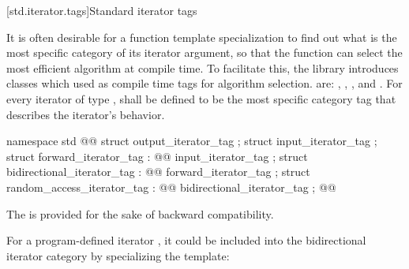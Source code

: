 [std.iterator.tags]{Standard iterator tags}

\pnum
{}%
%
%
%
%
It is often desirable for a
function template specialization
to find out what is the most specific category of its iterator
argument, so that the function can select the most efficient algorithm at compile time.
To facilitate this, the
library introduces
classes which  used as compile time tags for algorithm selection.
 are:
,
,
,
and
.
For every iterator of type
,
shall be defined to be the most specific category tag that describes the
iterator's behavior.

\begin{codeblock}
namespace std { @@
  struct output_iterator_tag { };
  struct input_iterator_tag { };
  struct forward_iterator_tag : @@ input_iterator_tag { };
  struct bidirectional_iterator_tag : @@ forward_iterator_tag { };
  struct random_access_iterator_tag : @@ bidirectional_iterator_tag { };
}@\added{\}\}\}}@
\end{codeblock}

\begin{addedblock}
\pnum
\enternote
The  is provided for the sake of backward compatibility.
\exitnote
\end{addedblock}

\pnum
{}%
%
%
%
%
%
\enterexample
For a program-defined iterator
,
it could be included
into the bidirectional iterator category by specializing the
\added{, }
 template:

